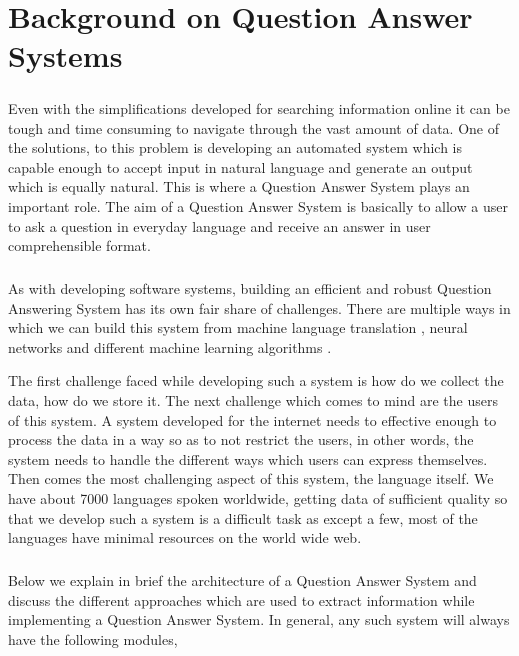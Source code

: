 \chapter{Background on Question Answer Systems}

\paragraph{}
Even with the simplifications developed for searching information online it can be tough and time consuming to navigate through the vast amount of data. One of the solutions, to this problem is developing an automated system which is capable enough to accept input in natural language and generate an output which is equally natural. This is where a Question Answer System plays an important role. The aim of a Question Answer System is basically to allow a user to ask a question in everyday language and receive an answer in user comprehensible format. 

\paragraph{}
As with developing software systems, building an efficient and robust Question Answering System has its own fair share of challenges. There are multiple ways in which we can build this system from  machine language translation \cite {bao2014knowledge}, neural networks \cite{iyyer2014neural} and different machine learning algorithms \cite{zhang2003question}.

The first challenge faced while developing such a system is how do we collect the data, how do we store it. The next challenge which comes to mind are the users of this system. A system developed for the internet needs to effective enough to process the data in a way so as to not restrict the users, in other words, the system needs to handle the different ways which users can express themselves. Then comes the most challenging aspect of this system, the language itself. We have about 7000 languages spoken worldwide, getting data of sufficient quality so that we develop such a system is a difficult task as except a few, most of the languages have minimal resources on the world wide web.
 
\paragraph{}
Below we explain in brief the architecture of a Question Answer System and discuss the different approaches which are used to extract information while implementing a Question Answer System. In general, any such system will always have the following modules,

